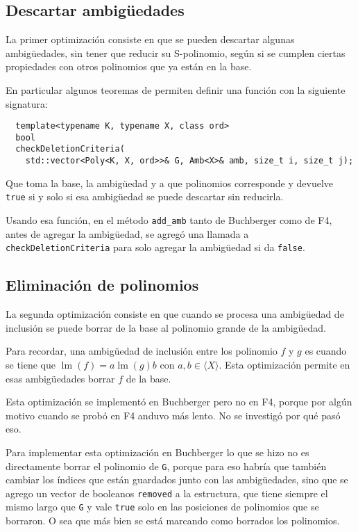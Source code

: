 \documentclass[12pt]{report}
\theoremstyle{customstyle}
\theoremstyle{factstyle}
\DeclareMathOperator{\lm}{lm}
\begin{document}
\subsection{Descartar ambigüedades}

La primer optimización consiste en que se pueden descartar algunas ambigüedades, sin tener que reducir su S-polinomio, según si se cumplen ciertas propiedades con otros polinomios que ya están en la base.

En particular algunos teoremas de \cite{thesis:Hof20} permiten definir una función con la siguiente signatura:

\begin{verbatim}
  template<typename K, typename X, class ord>
  bool
  checkDeletionCriteria(
    std::vector<Poly<K, X, ord>>& G, Amb<X>& amb, size_t i, size_t j);
\end{verbatim}

Que toma la base, la ambigüedad y a que polinomios corresponde y devuelve \texttt{true} si y solo si esa ambigüedad se puede descartar sin reducirla.

Usando esa función, en el método \texttt{add\_amb} tanto de Buchberger como de F4, antes de agregar la ambigüedad, se agregó una llamada a \texttt{checkDeletionCriteria} para solo agregar la ambigüedad si da \texttt{false}.

\subsection{Eliminación de polinomios}

La segunda optimización consiste en que cuando se procesa una ambigüedad de inclusión se puede borrar de la base al polinomio grande de la ambigüedad.

Para recordar, una ambigüedad de inclusión entre los polinomio $f$ y $g$ es cuando se tiene que $\lm(f) = a \lm(g) b$ con $a, b ∈ ⟨X⟩$. Esta optimización permite en esas ambigüedades borrar $f$ de la base.

Esta optimización se implementó en Buchberger pero no en F4, porque por algún motivo cuando se probó en F4 anduvo más lento. No se investigó por qué pasó eso.

Para implementar esta optimización en Buchberger lo que se hizo no es directamente borrar el polinomio de \texttt{G}, porque para eso habría que también cambiar los índices que están guardados junto con las ambigüedades, sino que se agrego un vector de booleanos \texttt{removed} a la estructura, que tiene siempre el mismo largo que \texttt{G} y vale \texttt{true} solo en las posiciones de polinomios que se borraron. O sea que más bien se está marcando como borrados los polinomios.
\end{document}
